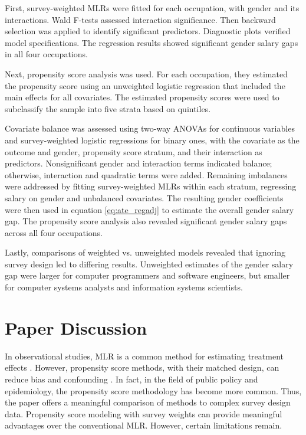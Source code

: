 \documentclass[12pt]{article}
\begin{document}
First, survey-weighted MLRs were fitted for each occupation, with gender and its interactions. Wald F-tests assessed interaction significance. Then backward selection was applied to identify significant predictors. Diagnostic plots verified model specifications. The regression results showed significant gender salary gaps in all four occupations. 

Next, propensity score analysis was used. For each occupation, they estimated the propensity score using an unweighted logistic regression that included the main effects for all covariates. The estimated propensity scores were used to subclassify the sample into five strata based on quintiles.

Covariate balance was assessed using two-way ANOVAs for continuous variables and survey-weighted logistic regressions for binary ones, with the covariate as the outcome and gender, propensity score stratum, and their interaction as predictors. Nonsignificant gender and interaction terms indicated balance; otherwise, interaction and quadratic terms were added. Remaining imbalances were addressed by fitting survey-weighted MLRs within each stratum, regressing salary on gender and unbalanced covariates. The resulting gender coefficients were then used in equation \eqref{eq:ate_regadj} to estimate the overall gender salary gap. The propensity score analysis also revealed significant gender salary gaps across all four occupations.

Lastly, comparisons of weighted vs. unweighted models revealed that ignoring survey design led to differing results. Unweighted estimates of the gender salary gap were larger for computer programmers and software engineers, but smaller for computer systems analysts and information systems scientists.

\section{Paper Discussion} \label{sec:discussion}

In observational studies, MLR is a common method for estimating treatment effects \cite{doi:https://doi.org/10.1002/0470090456.ch5}. However, propensity score methods, with their matched design, can reduce bias and confounding \cite{rosenbaum19834}. In fact, in the field of public policy and epidemiology, the propensity score methodology has become more common. Thus, the paper offers a meaningful comparison of methods to complex survey design data. Propensity score modeling with survey weights can provide meaningful advantages over the conventional MLR. However, certain limitations remain.
\end{document}
